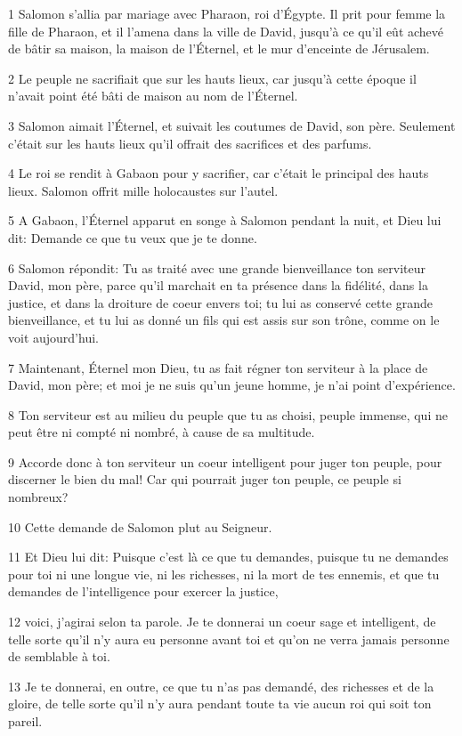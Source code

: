 \par 1 Salomon s'allia par mariage avec Pharaon, roi d'Égypte. Il prit pour femme la fille de Pharaon, et il l'amena dans la ville de David, jusqu'à ce qu'il eût achevé de bâtir sa maison, la maison de l'Éternel, et le mur d'enceinte de Jérusalem.
\par 2 Le peuple ne sacrifiait que sur les hauts lieux, car jusqu'à cette époque il n'avait point été bâti de maison au nom de l'Éternel.
\par 3 Salomon aimait l'Éternel, et suivait les coutumes de David, son père. Seulement c'était sur les hauts lieux qu'il offrait des sacrifices et des parfums.
\par 4 Le roi se rendit à Gabaon pour y sacrifier, car c'était le principal des hauts lieux. Salomon offrit mille holocaustes sur l'autel.
\par 5 A Gabaon, l'Éternel apparut en songe à Salomon pendant la nuit, et Dieu lui dit: Demande ce que tu veux que je te donne.
\par 6 Salomon répondit: Tu as traité avec une grande bienveillance ton serviteur David, mon père, parce qu'il marchait en ta présence dans la fidélité, dans la justice, et dans la droiture de coeur envers toi; tu lui as conservé cette grande bienveillance, et tu lui as donné un fils qui est assis sur son trône, comme on le voit aujourd'hui.
\par 7 Maintenant, Éternel mon Dieu, tu as fait régner ton serviteur à la place de David, mon père; et moi je ne suis qu'un jeune homme, je n'ai point d'expérience.
\par 8 Ton serviteur est au milieu du peuple que tu as choisi, peuple immense, qui ne peut être ni compté ni nombré, à cause de sa multitude.
\par 9 Accorde donc à ton serviteur un coeur intelligent pour juger ton peuple, pour discerner le bien du mal! Car qui pourrait juger ton peuple, ce peuple si nombreux?
\par 10 Cette demande de Salomon plut au Seigneur.
\par 11 Et Dieu lui dit: Puisque c'est là ce que tu demandes, puisque tu ne demandes pour toi ni une longue vie, ni les richesses, ni la mort de tes ennemis, et que tu demandes de l'intelligence pour exercer la justice,
\par 12 voici, j'agirai selon ta parole. Je te donnerai un coeur sage et intelligent, de telle sorte qu'il n'y aura eu personne avant toi et qu'on ne verra jamais personne de semblable à toi.
\par 13 Je te donnerai, en outre, ce que tu n'as pas demandé, des richesses et de la gloire, de telle sorte qu'il n'y aura pendant toute ta vie aucun roi qui soit ton pareil.
